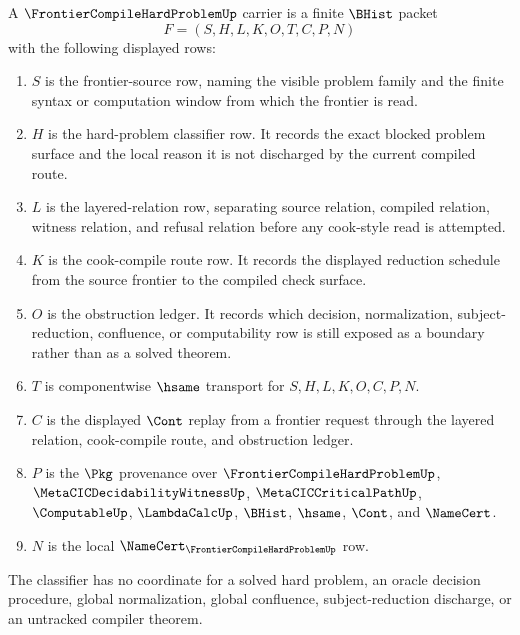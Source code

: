 \begin{definition}
\label{def:frontier-compile-hard-problem-carrier}
A $\FrontierCompileHardProblemUp$ carrier is a finite $\BHist$ packet
$$
F=(S,H,L,K,O,T,C,P,N)
$$
with the following displayed rows:
\begin{enumerate}
\item $S$ is the frontier-source row, naming the visible problem family and the finite syntax or computation window from which the frontier is read.
\item $H$ is the hard-problem classifier row. It records the exact blocked problem surface and the local reason it is not discharged by the current compiled route.
\item $L$ is the layered-relation row, separating source relation, compiled relation, witness relation, and refusal relation before any cook-style read is attempted.
\item $K$ is the cook-compile route row. It records the displayed reduction schedule from the source frontier to the compiled check surface.
\item $O$ is the obstruction ledger. It records which decision, normalization, subject-reduction, confluence, or computability row is still exposed as a boundary rather than as a solved theorem.
\item $T$ is componentwise $\hsame$ transport for $S,H,L,K,O,C,P,N$.
\item $C$ is the displayed $\Cont$ replay from a frontier request through the layered relation, cook-compile route, and obstruction ledger.
\item $P$ is the $\Pkg$ provenance over $\FrontierCompileHardProblemUp$, $\MetaCICDecidabilityWitnessUp$, $\MetaCICCriticalPathUp$, $\ComputableUp$, $\LambdaCalcUp$, $\BHist$, $\hsame$, $\Cont$, and $\NameCert$.
\item $N$ is the local $\NameCert_{\FrontierCompileHardProblemUp}$ row.
\end{enumerate}
The classifier has no coordinate for a solved hard problem, an oracle decision procedure, global normalization, global confluence, subject-reduction discharge, or an untracked compiler theorem.
\end{definition}

